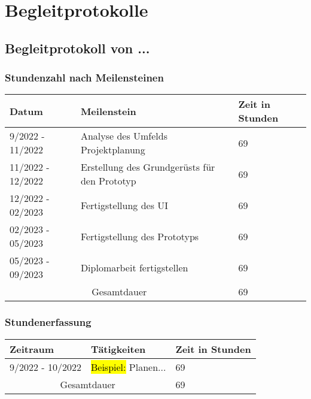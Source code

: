 \thispagestyle{empty}
\section{Begleitprotokolle}

\pagebreak

\subsection{Begleitprotokoll von ...} 

\subsubsection{Stundenzahl nach Meilensteinen}

\begin{tabular}{|m{}|m{}|m{}|}
    \hline
    \cellcolor{gray!10} Datum & \cellcolor{gray!10} Meilenstein & \cellcolor{gray!10} Zeit in Stunden \\
    \hline
    9/2022 - 11/2022 & Analyse des Umfelds Projektplanung & 69 \\
    \hline
    11/2022 - 12/2022 & Erstellung des Grundgerüsts für den Prototyp & 69 \\
    \hline
    12/2022 - 02/2023 & Fertigstellung des UI & 69 \\
    \hline
    02/2023 - 05/2023 & Fertigstellung des Prototyps & 69 \\
    \hline
    05/2023 - 09/2023 & Diplomarbeit fertigstellen & 69 \\ 
    \hline
    \multicolumn{2}{|c|}{\cellcolor{gray!30}Gesamtdauer} & 69 \\
    \hline
\end{tabular}

\noindent

\vspace{40pt}

\subsubsection{Stundenerfassung}

\begin{tabular}{|m{}|m{}|m{}|}
    \hline
    \cellcolor{gray!10} Zeitraum & \cellcolor{gray!10} Tätigkeiten & \cellcolor{gray!10} Zeit in Stunden \\
    \hline
    9/2022 - 10/2022 & \hl{Beispiel: } Planen... & 69 \\
    \hline
    \multicolumn{2}{|c|}{\cellcolor{gray!30}Gesamtdauer} & 69 \\
    \hline
\end{tabular}

\pagebreak
